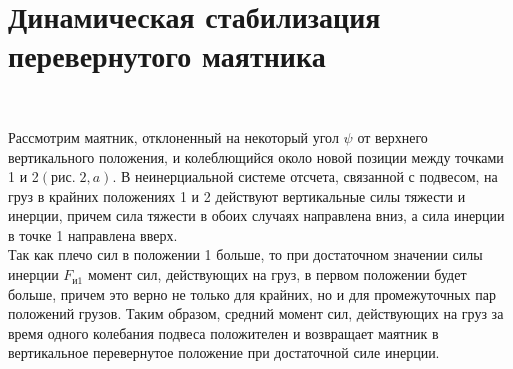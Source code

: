 \documentclass[a4paper,12pt]{article}
\begin{document}
\section{Динамическая стабилизация перевернутого маятника}
\begin{figure}
	\\
\end{figure}
Рассмотрим маятник, отклоненный на некоторый угол $\psi$ от верхнего вертикального положения, и колеблющийся около новой позиции между точками$\;$ 1 и 2$(рис.\;2, a)$. В неинерциальной системе отсчета, связанной с подвесом, на груз в крайних положениях 1 и 2 действуют вертикальные силы тяжести и инерции, причем сила тяжести в обоих случаях направлена вниз, а сила инерции в точке 1 направлена вверх.\\

Так как плечо сил в положении 1 больше, то при достаточном значении силы инерции $F_{и1}$ момент сил, действующих на груз, в первом положении будет больше, причем это верно не только для крайних, но и для промежуточных пар положений грузов. Таким образом, средний момент сил, действующих на груз за время одного колебания подвеса положителен и возвращает маятник в вертикальное перевернутое положение при достаточной силе инерции.
\end{document}
